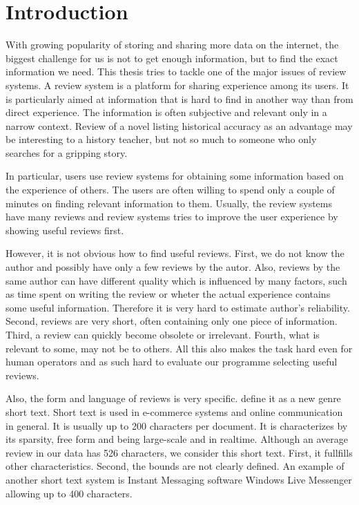 \chapter*{Introduction}

With growing popularity of storing and sharing more data on the internet, the biggest challenge
for us is not to get enough information, but to find the exact information we need.
This thesis tries to tackle one of the major issues of review systems.
A review system is a platform for sharing experience among its users.
It is particularly aimed at information that is hard to find in another way than from direct experience.
The information is often subjective and relevant only in a narrow context.
Review of a novel listing historical accuracy as an advantage may be interesting to a history teacher,
but not so much to someone who only searches for a gripping story.

In particular, users use review systems for obtaining some information based on the experience of others.
The users are often willing to spend only a couple of minutes on finding relevant information to them.
Usually, the review systems have many reviews and review systems tries to improve the user experience by showing useful reviews first.

However, it is not obvious how to find useful reviews.
First, we do not know the author and possibly have only a few reviews by the autor.
Also, reviews by the same author can have different quality which is influenced by many factors,
such as time spent on writing the review or wheter the actual experience contains some useful information.
Therefore it is very hard to estimate author's reliability.
Second, reviews are very short, often containing only one piece of information.
Third, a review can quickly become obsolete or irrelevant.
Fourth, what is relevant to some, may not be to others.
All this also makes the task hard even for human operators and as such hard to evaluate our programme selecting useful reviews.

Also, the form and language of reviews is very specific.
\citet{Song14} define it as a new genre short text.
Short text is used in e-commerce systems and online communication in general.
It is usually up to 200 characters per document.
It is characterizes by its sparsity, free form and being large-scale and in realtime.
Although an average review in our data has 526 characters, we consider this short text.
First, it fullfills other characteristics.
Second, the bounds are not clearly defined.
An example of another short text system is Instant Messaging software Windows Live Messenger allowing up to 400 characters.

